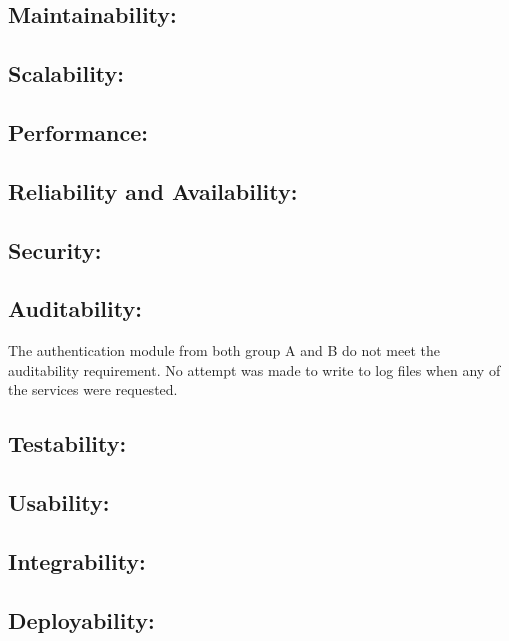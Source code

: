 \subsection{Maintainability:}

\subsection{Scalability:}

\subsection{Performance:}

\subsection{Reliability and Availability:}

\subsection{Security:}

\subsection{Auditability:}
The authentication module from both group A and B do not meet the auditability requirement. No attempt was made to write to log files when any of the services were requested.

\subsection{Testability:}

\subsection{Usability:}

\subsection{Integrability:}

\subsection{Deployability:}